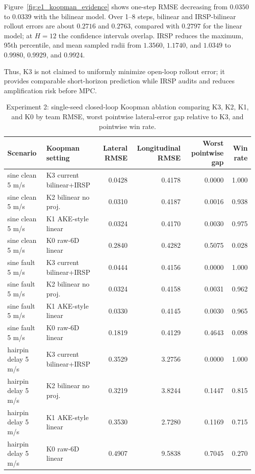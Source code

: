 \documentclass[letterpaper,journal]{IEEEtran}
\begin{document}
Figure~\ref{fig:e1_koopman_evidence} shows one-step RMSE decreasing from $0.0350$ to $0.0339$ with the bilinear model. Over 1--8 steps, bilinear and IRSP-bilinear rollout errors are about $0.2716$ and $0.2763$, compared with $0.2797$ for the linear model; at $H=12$ the confidence intervals overlap. IRSP reduces the maximum, 95th percentile, and mean sampled radii from $1.3560$, $1.1740$, and $1.0349$ to $0.9980$, $0.9929$, and $0.9924$.

Thus, K3 is not claimed to uniformly minimize open-loop rollout error; it provides comparable short-horizon prediction while IRSP audits and reduces amplification risk before MPC.

\begin{table}[!tbp]
\centering
\caption{Experiment 2: single-seed closed-loop Koopman ablation comparing K3, K2, K1, and K0 by team RMSE, worst pointwise lateral-error gap relative to K3, and pointwise win rate.}
\label{tab:e9_koopman_dim}
\footnotesize
\begin{tabular}{llrrrr}
\toprule
Scenario & Koopman setting & Lateral RMSE & Longitudinal RMSE & Worst pointwise gap & Win rate\\
\midrule
sine clean 5 m/s & K3 current bilinear+IRSP & 0.0428 & 0.4178 & 0.0000 & 1.000\\
sine clean 5 m/s & K2 bilinear no proj. & 0.0310 & 0.4187 & 0.0016 & 0.938\\
sine clean 5 m/s & K1 AKE-style linear & 0.0324 & 0.4170 & 0.0030 & 0.975\\
sine clean 5 m/s & K0 raw-6D linear & 0.2840 & 0.4282 & 0.5075 & 0.028\\
sine fault 5 m/s & K3 current bilinear+IRSP & 0.0444 & 0.4156 & 0.0000 & 1.000\\
sine fault 5 m/s & K2 bilinear no proj. & 0.0324 & 0.4158 & 0.0031 & 0.962\\
sine fault 5 m/s & K1 AKE-style linear & 0.0330 & 0.4145 & 0.0030 & 0.965\\
sine fault 5 m/s & K0 raw-6D linear & 0.1819 & 0.4129 & 0.4643 & 0.098\\
hairpin delay 5 m/s & K3 current bilinear+IRSP & 0.3529 & 3.2756 & 0.0000 & 1.000\\
hairpin delay 5 m/s & K2 bilinear no proj. & 0.3219 & 3.8244 & 0.1447 & 0.815\\
hairpin delay 5 m/s & K1 AKE-style linear & 0.3530 & 2.7280 & 0.1169 & 0.715\\
hairpin delay 5 m/s & K0 raw-6D linear & 0.4907 & 9.5838 & 0.7045 & 0.270\\
\bottomrule
\end{tabular}
\end{table}
\end{document}
